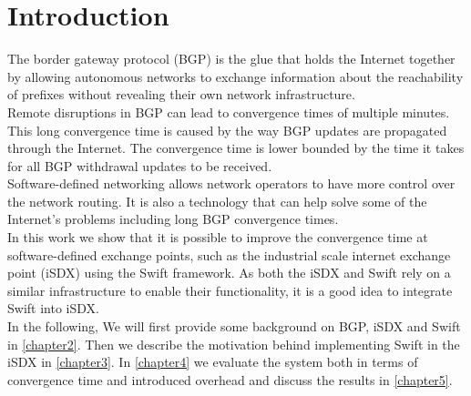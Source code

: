 

\chapter{\label{introduction}Introduction}
The border gateway protocol (BGP) is the glue that holds the Internet together by allowing autonomous networks to exchange information about the reachability of prefixes without revealing their own network infrastructure. \\
Remote disruptions in BGP can lead to convergence times of multiple minutes. This long convergence time is caused by the way BGP updates are propagated through the Internet. The convergence time is lower bounded by the time it takes for all BGP withdrawal updates to be received. \\
Software-defined networking allows network operators to have more control over the network routing. It is also a technology that can help solve some of the Internet's problems including long BGP convergence times. \\
In this work we show that it is possible to improve the convergence time at software-defined exchange points, such as the industrial scale internet exchange point (iSDX) using the Swift framework. As both the iSDX and Swift rely on a similar infrastructure to enable their functionality, it is a good idea to integrate Swift into iSDX. \\

In the following, We will first provide some background on BGP, iSDX and Swift in \ref{chapter2}. Then we describe the motivation behind implementing Swift in the iSDX in \ref{chapter3}. In \ref{chapter4} we evaluate the system both in terms of convergence time and introduced overhead and discuss the results in \ref{chapter5}. 




